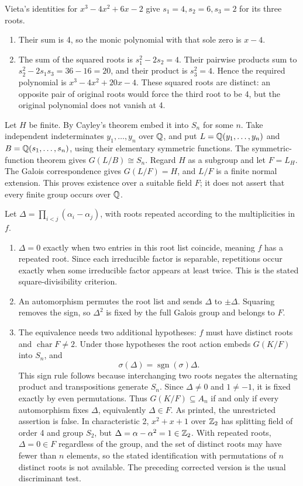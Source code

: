 Vieta's identities for $x^3-4x^2+6x-2$ give $s_1=4,s_2=6,s_3=2$ for its three roots.
\begin{enumerate}[label=(\alph*)]
\item Their sum is 4, so the monic polynomial with that sole zero is $x-4$.
\item The sum of the squared roots is $s_1^2-2s_2=4$. Their pairwise products sum to $s_2^2-2s_1s_3=36-16=20$, and their product is $s_3^2=4$. Hence the required polynomial is $x^3-4x^2+20x-4$. These squared roots are distinct: an opposite pair of original roots would force the third root to be 4, but the original polynomial does not vanish at 4.
\end{enumerate}

Let $H$ be finite. By Cayley's theorem embed it into $S_n$ for some $n$. Take independent indeterminates $y_1,\ldots,y_n$ over $\mathbb{Q}$, and put $L=\mathbb{Q}(y_1,\ldots,y_n)$ and $B=\mathbb{Q}(s_1,\ldots,s_n)$, using their elementary symmetric functions. The symmetric-function theorem gives $G(L/B)\cong S_n$. Regard $H$ as a subgroup and let $F=L_H$. The Galois correspondence gives $G(L/F)=H$, and $L/F$ is a finite normal extension. This proves existence over a suitable field $F$; it does not assert that every finite group occurs over $\mathbb{Q}$.

Let $\Delta=\prod_{i<j}(\alpha_i-\alpha_j)$, with roots repeated according to the multiplicities in $f$.
\begin{enumerate}[label=(\alph*)]
\item $\Delta=0$ exactly when two entries in this root list coincide, meaning $f$ has a repeated root. Since each irreducible factor is separable, repetitions occur exactly when some irreducible factor appears at least twice. This is the stated square-divisibility criterion.
\item An automorphism permutes the root list and sends $\Delta$ to $\pm\Delta$. Squaring removes the sign, so $\Delta^2$ is fixed by the full Galois group and belongs to $F$.
\item The equivalence needs two additional hypotheses: $f$ must have distinct roots and $\operatorname{char}F\ne2$. Under those hypotheses the root action embeds $G(K/F)$ into $S_n$, and
\[\sigma(\Delta)=\operatorname{sgn}(\sigma)\Delta.\]
This sign rule follows because interchanging two roots negates the alternating product and transpositions generate $S_n$. Since $\Delta\ne0$ and $1\ne-1$, it is fixed exactly by even permutations. Thus $G(K/F)\subseteq A_n$ if and only if every automorphism fixes $\Delta$, equivalently $\Delta\in F$.
As printed, the unrestricted assertion is false. In characteristic 2, $x^2+x+1$ over $\mathbb{Z}_2$ has splitting field of order 4 and group $S_2$, but $\Delta=\alpha-\alpha^2=1\in\mathbb{Z}_2$. With repeated roots, $\Delta=0\in F$ regardless of the group, and the set of distinct roots may have fewer than $n$ elements, so the stated identification with permutations of $n$ distinct roots is not available. The preceding corrected version is the usual discriminant test.
\end{enumerate}

